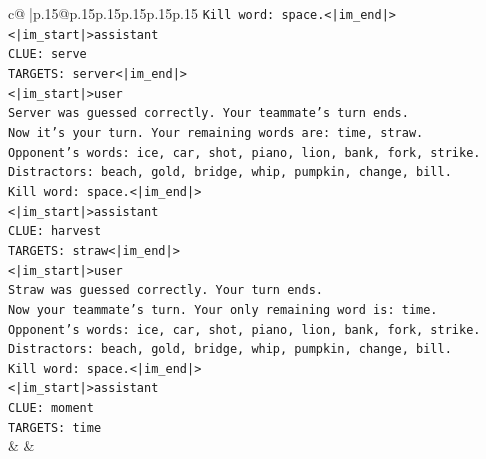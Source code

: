 \documentclass{article}
\begin{document}
{\begin{supertabular}{c@{$\;$}|p{.15\linewidth}@{}p{.15\linewidth}p{.15\linewidth}p{.15\linewidth}p{.15\linewidth}p{.15\linewidth}}
{{{\texttt{Kill word: space.<|im\_end|>} \\
\texttt{<|im\_start|>assistant} \\
\texttt{CLUE: serve} \\
\texttt{TARGETS: server<|im\_end|>} \\
\texttt{<|im\_start|>user} \\
\texttt{Server was guessed correctly. Your teammate's turn ends.} \\
\texttt{Now it's your turn. Your remaining words are: time, straw.} \\
\texttt{Opponent's words: ice, car, shot, piano, lion, bank, fork, strike.} \\
\texttt{Distractors: beach, gold, bridge, whip, pumpkin, change, bill.} \\
\texttt{Kill word: space.<|im\_end|>} \\
\texttt{<|im\_start|>assistant} \\
\texttt{CLUE: harvest} \\
\texttt{TARGETS: straw<|im\_end|>} \\
\texttt{<|im\_start|>user} \\
\texttt{Straw was guessed correctly. Your turn ends.} \\
\texttt{Now your teammate's turn. Your only remaining word is: time.} \\
\texttt{Opponent's words: ice, car, shot, piano, lion, bank, fork, strike.} \\
\texttt{Distractors: beach, gold, bridge, whip, pumpkin, change, bill.} \\
\texttt{Kill word: space.<|im\_end|>} \\
\texttt{<|im\_start|>assistant} \\
\texttt{CLUE: moment} \\
\texttt{TARGETS: time} \\
            }
        }
    }
    & & \\ \\


\end{supertabular}}
\end{document}
